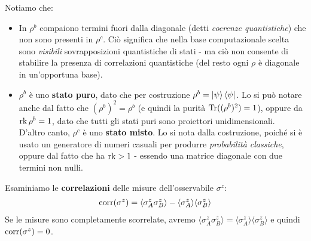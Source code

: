\documentclass[../../InformazioneQuantistica.tex]{subfiles}
\begin{document}
Notiamo che: 
\begin{itemize}
    \item In $\rho^b$ compaiono termini fuori dalla diagonale (detti \textit{coerenze quantistiche}) che non sono presenti in $\rho^c$. Ciò significa che nella base computazionale scelta sono \textit{visibili} sovrapposizioni quantistiche di stati - ma ciò non consente di stabilire la presenza di correlazioni quantistiche (del resto ogni $\rho$ è diagonale in un'opportuna base).
    \item $\rho^b$ è uno \textbf{stato puro}, dato che per costruzione $\rho^b = \Ket{\psi}\Bra{\psi}$. Lo si può notare anche dal fatto che $(\rho^b)^2 = \rho^b$ (e quindi la purità $\operatorname{Tr}((\rho^b)^2)=1$), oppure da $\operatorname{rk}\rho^b = 1$, dato che tutti gli stati puri sono proiettori unidimensionali.\\
    D'altro canto, $\rho^c$ è uno \textbf{stato misto}. Lo si nota dalla costruzione, poiché si è usato un generatore di numeri casuali per produrre \textit{probabilità classiche}, oppure dal fatto che ha $\operatorname{rk} > 1$ - essendo una matrice diagonale con due termini non nulli.
\end{itemize}

Esaminiamo le \textbf{correlazioni} delle misure dell'osservabile $\sigma^z$: 
\begin{align*}
\operatorname{corr}(\sigma^z) = \langle \sigma_A^z \sigma_B^z\rangle - \langle \sigma_A^z\rangle \langle \sigma_B^z\rangle 
\end{align*}
Se le misure sono completamente scorrelate, avremo $\langle \sigma_A^z \sigma_B^z \rangle = \langle \sigma_A^z \rangle \langle \sigma_B^z \rangle$ e quindi $\operatorname{corr}(\sigma^z) = 0$.\\
\end{document}
